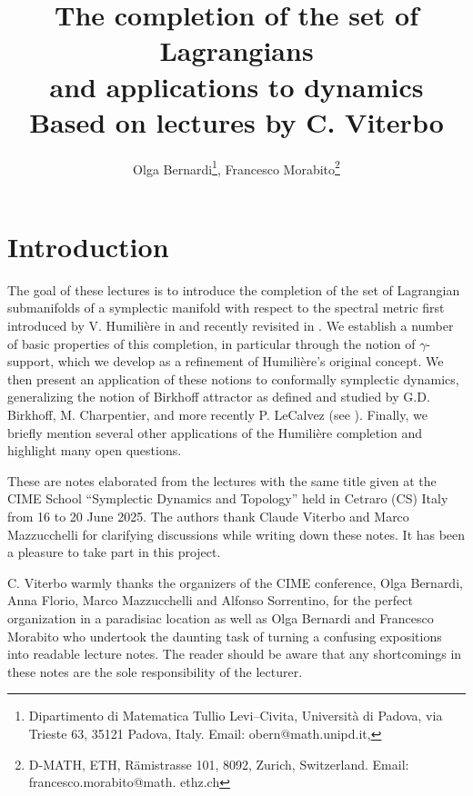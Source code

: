 \documentclass{article}
\title{The completion of the set of Lagrangians \\
and applications to dynamics \\ \Large  Based on lectures by C. Viterbo}
\author{Olga Bernardi\footnote{Dipartimento di Matematica Tullio Levi--Civita, Università di Padova, via Trieste 63, 35121 Padova, Italy. Email: obern@math.unipd.it,}, Francesco Morabito\footnote{D-MATH, ETH, R\"amistrasse 101, 8092, Zurich, Switzerland. Email: francesco.morabito@math. ethz.ch}}
\newcommand{\1}{\mathbbm{1}}
\theoremstyle{remark}
\begin{document}
\maketitle
\section{Introduction}
The goal of these lectures is to introduce the completion of the set of Lagrangian submanifolds of a symplectic manifold with respect to the spectral metric first introduced by V. Humilière in \cite{hum08} and recently revisited in \cite{vit22}.  We establish a number of basic properties of this completion, in particular through the notion of $\gamma$-support, which we develop as a refinement of Humilière's original concept. We then present an application of these notions to conformally symplectic dynamics, generalizing the notion of Birkhoff attractor as defined and studied by G.D. Birkhoff, M. Charpentier, and more recently P. LeCalvez (see \cite{bir32, cha34, lec88}). Finally, we briefly mention several other applications of the Humilière completion and highlight many open questions.

These are notes elaborated from the lectures with the same title given at the CIME School ``Symplectic Dynamics and Topology'' held in Cetraro (CS) Italy from 16 to 20 June 2025. The authors thank Claude Viterbo and Marco Mazzucchelli for clarifying discussions while writing down these notes. It has been a pleasure to take part in this project.

C. Viterbo  warmly thanks the organizers of the CIME conference, Olga Bernardi, Anna Florio, Marco Mazzucchelli and Alfonso Sorrentino, for the perfect organization in a paradisiac location as well as Olga Bernardi and Francesco Morabito who undertook the daunting task of turning a confusing expositions into readable lecture notes. 
The reader should be aware that any shortcomings in these notes are the sole responsibility of the lecturer.
\end{document}
